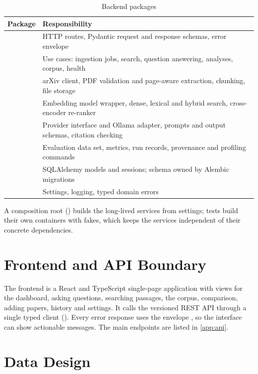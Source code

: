 \begin{table}[htbp]
  \centering
  \caption{Backend packages}\label{tab:packages}
  {\small
  \begin{tabularx}{\textwidth}{@{}lL@{}}
    \toprule
    \textbf{Package} & \textbf{Responsibility} \\
    \midrule
     & HTTP routes, Pydantic request and response schemas, error envelope \\
     & Use cases: ingestion jobs, search, question answering, analyses, corpus, health \\
     & arXiv client, PDF validation and page-aware extraction, chunking, file storage \\
     & Embedding model wrapper, dense, lexical and hybrid search, cross-encoder re-ranker \\
     & Provider interface and Ollama adapter, prompts and output schemas, citation checking \\
     & Evaluation data set, metrics, run records, provenance and profiling commands \\
     & SQLAlchemy models and sessions; schema owned by Alembic migrations \\
     & Settings, logging, typed domain errors \\
    \bottomrule
  \end{tabularx}
  }
\end{table}

A composition root () builds the long-lived services from settings; tests build their own
containers with fakes, which keeps the services independent of their concrete dependencies.

\section{Frontend and API Boundary}

The frontend is a React and TypeScript single-page application with views for the dashboard, asking questions,
searching passages, the corpus, comparison, adding papers, history and settings. It calls the versioned REST API
through a single typed client (). Every error response uses the envelope
, so the interface can show actionable messages. The main endpoints are
listed in \autoref{app:api}.

\section{Data Design}

